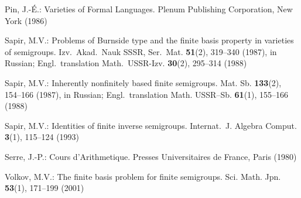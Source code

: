 \documentclass[smallextended]{svjour3}
\begin{document}
\begin{thebibliography}{99}
Pin, J.-\'E.: Varieties of Formal Languages. Plenum Publishing Corporation, New York (1986)

Sapir, M.V.: Problems of Burnside type and the finite basis property in varieties of semigroups. Izv.\ Akad.\ Nauk SSSR, Ser.\ Mat.
\textbf{51}(2), 319--340 (1987), in Russian; Engl.\ translation Math.\ USSR-Izv. \textbf{30}(2), 295--314 (1988)

Sapir, M.V.: Inherently nonfinitely based finite semigroups. Mat. Sb. \textbf{133}(2), 154--166 (1987), in Russian; Engl.\ translation
Math. USSR--Sb. \textbf{61}(1), 155--166 (1988)

Sapir, M.V.: Identities of finite inverse semigroups. Internat.\ J. Algebra Comput. \textbf{3}(1), 115--124 (1993)

Serre, J.-P.: Cours d'Arithmetique. Presses Universitaires de France, Paris (1980)

Volkov, M.V.: The finite basis problem for finite semigroups. Sci. Math. Jpn. \textbf{53}(1), 171--199 (2001)
\end{thebibliography}
\end{document}
